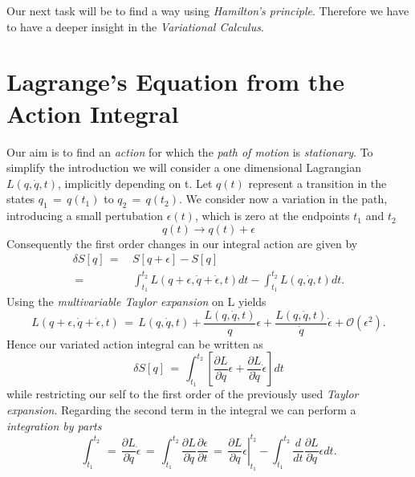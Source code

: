 \documentclass{report}
\begin{document}
Our next task will be to find a way using \textit{Hamilton's principle}.
Therefore we have to have a deeper insight in the \textit{Variational
Calculus}.

\section{Lagrange's Equation from the Action Integral}
Our aim is to find an \textit{action} for which the \textit{path of motion} is
\textit{stationary}. To simplify the introduction we will consider a one
dimensional Lagrangian $L(q, \dot q, t)$, implicitly depending on t. Let $q(t)$
represent a transition in the states $q_1 \,=\, q(t_1)$ to $q_2 \,=\, q(t_2)$. We
consider now a variation in the path, introducing a small pertubation
$\epsilon(t)$, which is zero at the endpoints $t_1$ and $t_2$
\begin{equation}
  q(t) \longrightarrow q(t) + \epsilon 
\end{equation}
Consequently the first order changes in our integral action are given by
\begin{equation}
  \begin{aligned}
  \delta S[q] \,=\,& S[q + \epsilon] - S[q] \\
  \,=\,& \int_{t_1}^{t_2} L(q + \epsilon, \dot q + \dot \epsilon, t) dt -
\int_{t_1}^{t_2} L(q, \dot q, t) dt.
  \end{aligned}
\end{equation}
Using the \textit{multivariable Taylor expansion} on L yields
\begin{equation}
  L(q + \epsilon, \dot q + \dot \epsilon, t) \,=\, L(q, \dot q, t) + \frac{L(q,
\dot q, t)}{q} \epsilon + \frac{L(q, \dot q, t)}{\dot q} \dot \epsilon +
\mathcal O(\epsilon^2).
\end{equation}
Hence our variated action integral can be written as 
\begin{equation}
  \delta S[q] \,=\, \int_{t_1}^{t_2} \left[\frac{\partial L}{\partial q} \epsilon +
\frac{\partial L}{\partial \dot q} \dot \epsilon  \right] dt
\end{equation}
while restricting our self to the first order of the previously used
\textit{Taylor expansion}. Regarding the second term in the integral we can
perform a \textit{integration by parts}
\begin{equation}
  \int_{t_1}^{t_2} \,=\, \frac{\partial L}{\partial \dot q} \dot \epsilon \,=\,
\int_{t_1}^{t_2} \frac{\partial L}{\partial \dot q}\frac{\partial
\epsilon}{\partial t} \,=\, \left. \frac{\partial L}{\partial q} \epsilon
\right|_{t_1}^{t_2} - \int_{t_1}^{t_2} \frac{d}{d t} \frac{\partial L}{\partial 
\dot q} \epsilon dt .
\end{equation}
\end{document}
